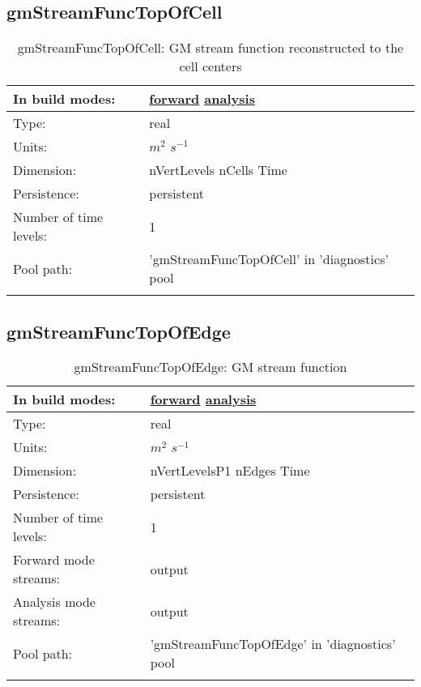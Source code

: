 \subsection[gmStreamFuncTopOfCell]{gmStreamFuncTopOfCell}
\label{subsec:var_sec_diagnostics_gmStreamFuncTopOfCell}
\begin{center}
\begin{longtable}{| p{2.0in} | p{4.0in} |}
        \hline 
        In build modes: & \hyperref[subsec:forward_var_tab_diagnostics]{forward} \hyperref[subsec:analysis_var_tab_diagnostics]{analysis} \\
        \hline 
        Type: & real \\
        \hline 
        Units: & $m^2$ $s^{-1}$ \\
        \hline 
        Dimension: & nVertLevels nCells Time \\
        \hline 
        Persistence: & persistent \\
        \hline 
        Number of time levels: & 1 \\
        \hline 
            Pool path: & 'gmStreamFuncTopOfCell' in 'diagnostics' pool
 \\
		 \hline 
    \caption{gmStreamFuncTopOfCell: GM stream function reconstructed to the cell centers}
\end{longtable}
\end{center}
\subsection[gmStreamFuncTopOfEdge]{gmStreamFuncTopOfEdge}
\label{subsec:var_sec_diagnostics_gmStreamFuncTopOfEdge}
\begin{center}
\begin{longtable}{| p{2.0in} | p{4.0in} |}
        \hline 
        In build modes: & \hyperref[subsec:forward_var_tab_diagnostics]{forward} \hyperref[subsec:analysis_var_tab_diagnostics]{analysis} \\
        \hline 
        Type: & real \\
        \hline 
        Units: & $m^2$ $s^{-1}$ \\
        \hline 
        Dimension: & nVertLevelsP1 nEdges Time \\
        \hline 
        Persistence: & persistent \\
        \hline 
        Number of time levels: & 1 \\
        \hline 
		 Forward mode streams: &  output \\
        \hline 
		 Analysis mode streams: &  output \\
        \hline 
            Pool path: & 'gmStreamFuncTopOfEdge' in 'diagnostics' pool
 \\
		 \hline 
    \caption{gmStreamFuncTopOfEdge: GM stream function}
\end{longtable}
\end{center}
